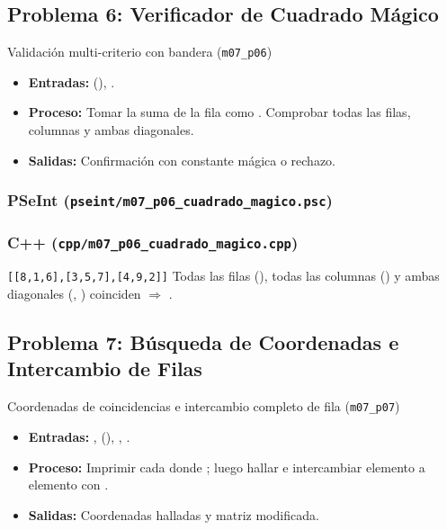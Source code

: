 \documentclass[11pt,letterpaper]{article}
\begin{document}
\subsection{Problema 6: Verificador de Cuadrado Mágico}
\begin{analisis}{Validación multi-criterio con bandera (\texttt{m07\_p06})}
\begin{itemize}
  \item \textbf{Entradas:}  (), .
  \item \textbf{Proceso:} Tomar la suma de la fila  como . Comprobar todas las filas, columnas y ambas diagonales.
  \item \textbf{Salidas:} Confirmación con constante mágica o rechazo.
\end{itemize}
\end{analisis}

\subsubsection*{PSeInt (\texttt{pseint/m07\_p06\_cuadrado\_magico.psc})}


\subsubsection*{C++ (\texttt{cpp/m07\_p06\_cuadrado\_magico.cpp})}


\begin{pruebaescritorio}{\texttt{[[8,1,6],[3,5,7],[4,9,2]]}}
Todas las filas (), todas las columnas () y ambas diagonales (, ) coinciden $\Rightarrow$ .
\end{pruebaescritorio}

\subsection{Problema 7: Búsqueda de Coordenadas e Intercambio de Filas}
\begin{analisis}{Coordenadas de coincidencias e intercambio completo de fila (\texttt{m07\_p07})}
\begin{itemize}
  \item \textbf{Entradas:} ,  (), , .
  \item \textbf{Proceso:} Imprimir cada  donde ; luego hallar  e intercambiar elemento a elemento  con .
  \item \textbf{Salidas:} Coordenadas halladas y matriz modificada.
\end{itemize}
\end{analisis}
\end{document}
